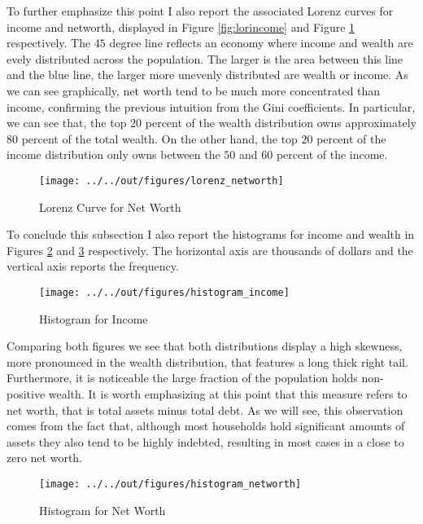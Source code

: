 \documentclass[11pt, a4paper, leqno]{article}
\begin{document}
To further emphasize this point I also report the associated Lorenz curves for income and networth, displayed in Figure \ref*{fig:lorincome} and Figure \ref*{fig:lornetworth} respectively. The $45$ degree line reflects an economy where income and wealth are evely distributed across the population. The larger is the area between this line and the blue line, the larger more unevenly distributed are wealth or income. As we can see graphically, net worth tend to be much more concentrated than income, confirming the previous intuition from the Gini coefficients. In particular, we can see that, the top $20$ percent of the wealth distribution owns approximately $80$ percent of the total wealth. On the other hand, the top $20$ percent of the income distribution only owns between the $50$ and $60$ percent of the income. 


\begin{figure}[H]
    \caption{Lorenz Curve for Net Worth}
    
    \texttt{[image: ../../out/figures/lorenz\_networth]}
    \label{fig:lornetworth}

\end{figure}

To conclude this subsection I also report the histograms for income and wealth in Figures \ref*{fig:histincome} and \ref*{fig:histnetworth} respectively. The horizontal axis are thousands of dollars and the vertical axis reports the frequency. 

\begin{figure}[h]
    \caption{Histogram for Income}
    
    \texttt{[image: ../../out/figures/histogram\_income]}
    \label{fig:histincome}
\end{figure}

Comparing both figures we see that both distributions display a high skewness, more pronounced in the wealth distribution, that features a long thick right tail. Furthermore, it is noticeable the large fraction of the population holds non-positive wealth. It is worth emphasizing at this point that this measure refers to net worth, that is total assets minus total debt. As we will see, this observation comes from the fact that, although most households hold significant amounts of assets they also tend to be highly indebted, resulting in most cases in a close to zero net worth.

\begin{figure}[h]
    \caption{Histogram for Net Worth}
    
    \texttt{[image: ../../out/figures/histogram\_networth]}
    \label{fig:histnetworth}
\end{figure}
\end{document}
